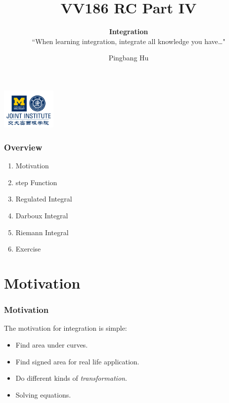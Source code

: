 \documentclass[12pt, t]{beamer}
\title{VV186 RC Part IV}
\subtitle{\textbf{Integration}\\``When learning integration, integrate all knowledge you have\dots"}
\institute[UM-SJTU JI]{University of Michigan-Shanghai Jiao Tong University Joint Institute}
\author{Pingbang Hu}
\renewcommand{\emph}[1]{{\color{Turquoise3}\textsl{#1}}}
\begin{document}
\begin{frame}
    \titlepage
    \begin{center}
        \includegraphics[height=2cm]{Figures/logo/logo2.png}
    \end{center}
\end{frame}

\begin{frame}
    \frametitle{Overview}
    \begin{enumerate}
        \item Motivation
        \item step Function
        \item Regulated Integral
        \item Darboux Integral
        \item Riemann Integral
        \item Exercise
    \end{enumerate}
\end{frame}

\section{Motivation}
\begin{frame}
    \frametitle{Motivation}
The motivation for integration is simple:
\begin{itemize}
    \item Find area under curves.
    \item Find signed area for real life application.
    \item Do different kinds of \emph{transformation}.
    \item Solving equations.
\end{itemize}
\end{frame}
\end{document}

